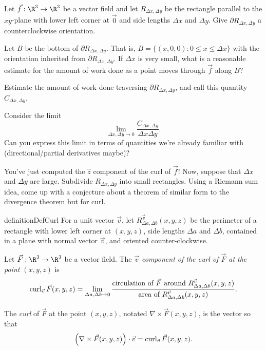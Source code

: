\begin{question}
	Let $\vec f:\R^3\to\R^3$ be a vector field and let $R_{\Delta x, \Delta y}$ be the 
	rectangle parallel to the $xy$-plane with lower left corner at $\vec 0$ and side lengths
	$\Delta x$ and $\Delta y$.  Give $\partial R_{\Delta x, \Delta y}$ a counterclockwise
	orientation.
	\begin{parts}
		\item Let $B$ be the bottom of $\partial R_{\Delta x, \Delta y}$.  That is, 
			$B=\{(x,0,0): 0\leq x\leq \Delta x\}$ with the orientation
			inherited from $\partial R_{\Delta x, \Delta y}$.  If $\Delta x$
			is very small, what is a reasonable estimate for the amount of work
			done as a point moves through $\vec f$ along $B$?
		\item Estimate the amount of work done traversing $\partial R_{\Delta x, \Delta y}$,
			and call this quantity $C_{\Delta x, \Delta y}$.
		\item Consider the limit
			\[
				\lim_{\Delta x,\Delta y\to 0} \frac{C_{\Delta x, \Delta y}}{\Delta x \Delta y}.
			\]
			Can you express this limit in terms of quantities we're already familiar with 
			(directional/partial derivatives maybe)?
		\item You've just computed the $\hat z$ component of the curl of $\vec f$!
			Now, suppose that $\Delta x$ and $\Delta y$ are large.  Subdivide $R_{\Delta x, \Delta y}$
			into small rectangles.  Using a Riemann sum idea, come up with a conjecture
			about a theorem of similar form to the divergence theorem but for curl.
	\end{parts}
\end{question}


\begin{restatable*}[Curl]{definition}{DefCurl}
	For a unit vector $\vec v$, 
	let $R^{\vec v}_{\Delta a,\Delta b}(x,y,z)$ be the perimeter
	of a rectangle with lower left
	corner at $(x,y,z)$, side lengths $\Delta a$ and $\Delta b$, contained
	in a plane with normal vector $\vec v$, and oriented counter-clockwise.

	Let $\vec F:\R^3\to\R^3$ be a vector field.  The \emph{$\vec v$
	component of the curl of $\vec F$ at the point $(x,y,z)$} is
	\[
		\operatorname{curl}_{\vec v}\vec F(x,y,z) = \lim_{\Delta a,\Delta b\to 0}
		\frac{
			\text{circulation of }\vec F\text{ around }R^{\vec v}_{\Delta a,\Delta b}(x,y,z)
			}{
			\text{area of }R^{\vec v}_{\Delta a,\Delta b}(x,y,z)}.
	\]

	The \emph{curl} of $\vec F$ at the point $(x,y,z)$, notated
	$\nabla \times \vec F(x,y,z)$, is the vector so that
	\[\Big(\nabla \times \vec F(x,y,z)\Big)\cdot \vec v = \operatorname{curl}_{\vec v}\vec F(x,y,z).\]
\end{restatable*}



